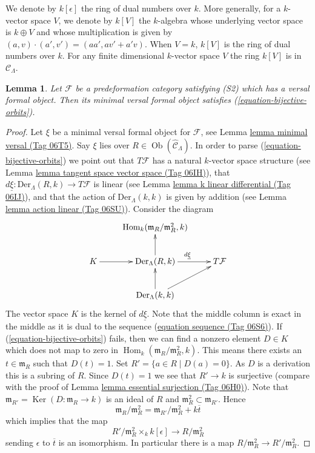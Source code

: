 \documentclass{amsart}
\theoremstyle{plain}
\newtheorem{lemma}[subsection]{Lemma}
\theoremstyle{definition}
\theoremstyle{remark}
\numberwithin{equation}{subsection}
\def\Hom{\mathop{\mathrm{Hom}}\nolimits}
\def\Ob{\mathop{\mathrm{Ob}}\nolimits}
\def\Ker{\mathop{\mathrm{Ker}}}
\begin{document}
\medskip\noindent
We denote by $k[\epsilon]$ the ring of dual numbers over $k$.  More
generally, for a $k$-vector space $V$, we denote by $k[V]$ the $k$-algebra
whose underlying vector space is $k \oplus V$ and whose multiplication is given
by $(a, v) \cdot (a', v') = (aa', av' + a'v)$.  When $V = k$, $k[V]$ is the ring
of dual numbers over $k$.  For any finite dimensional $k$-vector space $V$
the ring $k[V]$ is in $\mathcal{C}_\Lambda$.


\begin{lemma}
\label{lemma-construct-bijective-orbits}
Let $\mathcal{F}$ be a predeformation category satisfying
(S2) which has a versal formal object. Then its minimal versal
formal object satisfies (\ref{equation-bijective-orbits}).
\end{lemma}

\begin{proof}
Let $\xi$ be a minimal versal formal object for $\mathcal{F}$, see
Lemma \href{https://stacks.math.columbia.edu/tag/06T5}{lemma minimal versal (Tag 06T5)}.
Say $\xi$ lies over $R \in \Ob(\widehat{\mathcal{C}}_\Lambda)$.
In order to parse (\ref{equation-bijective-orbits}) we point out
that $T\mathcal{F}$ has a natural $k$-vector space structure
(see
Lemma \href{https://stacks.math.columbia.edu/tag/06IH}{lemma tangent space vector space (Tag 06IH)}),
that $d\underline{\xi} : \text{Der}_\Lambda(R, k) \to T\mathcal{F}$
is linear (see
Lemma \href{https://stacks.math.columbia.edu/tag/06IJ}{lemma k linear differential (Tag 06IJ)}),
and that the action of $\text{Der}_\Lambda(k, k)$ is
given by addition (see
Lemma \href{https://stacks.math.columbia.edu/tag/06SU}{lemma action linear (Tag 06SU)}).
Consider the diagram
$$
\xymatrix{
& \Hom_k(\mathfrak m_R/\mathfrak m_R^2, k) \\
K \ar[r] & \text{Der}_\Lambda(R, k) \ar[r]^{d\underline{\xi}} \ar[u] &
T\mathcal{F} \\
& \text{Der}_\Lambda(k, k) \ar[u] \ar[ru]
}
$$
The vector space $K$ is the kernel of $d\underline{\xi}$.
Note that the middle column is exact in the middle as it is dual to the
sequence (\href{https://stacks.math.columbia.edu/tag/06S6}{equation sequence (Tag 06S6)}). If (\ref{equation-bijective-orbits})
fails, then we can find a nonzero element $D \in K$ which
does not map to zero in $\Hom_k(\mathfrak m_R/\mathfrak m_R^2, k)$.
This means there exists an $t \in \mathfrak m_R$ such that
$D(t) = 1$. Set $R' = \{a \in R \mid D(a) = 0\}$. As $D$ is a derivation
this is a subring of $R$. Since $D(t) = 1$ we see that $R' \to k$
is surjective (compare with the proof of
Lemma \href{https://stacks.math.columbia.edu/tag/06H0}{lemma essential surjection (Tag 06H0)}).
Note that $\mathfrak m_{R'} = \Ker(D : \mathfrak m_R \to k)$
is an ideal of $R$ and $\mathfrak m_R^2 \subset \mathfrak m_{R'}$. Hence
$$
\mathfrak m_R/\mathfrak m_R^2 =
\mathfrak m_{R'}/\mathfrak m_R^2 + k\overline{t}
$$
which implies that the map
$$
R'/\mathfrak m_R^2 \times_k k[\epsilon] \to R/\mathfrak m_R^2
$$
sending $\epsilon$ to $\overline{t}$ is an isomorphism. In particular
there is a map $R/\mathfrak m_R^2 \to R'/\mathfrak m_R^2$.


\end{proof}
\end{document}
